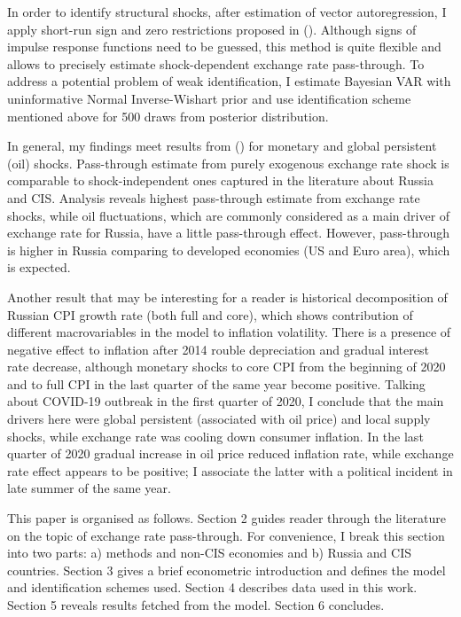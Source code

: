 \documentclass[12pt, a4paper]{extarticle}
\begin{document}
In order to identify structural shocks, after estimation of vector autoregression, I apply short-run sign and zero restrictions proposed in (\cite{Arias2014}). Although signs of impulse response functions need to be guessed, this method is quite flexible and allows to precisely estimate shock-dependent exchange rate pass-through. To address a potential problem of weak identification, I estimate Bayesian VAR with uninformative Normal Inverse-Wishart prior and use identification scheme mentioned above for 500 draws from posterior distribution. 

In general, my findings meet results from (\cite{Khotulev2020}) for monetary and global persistent (oil) shocks. Pass-through estimate from purely exogenous exchange rate shock is comparable to shock-independent ones captured in the literature about Russia and CIS. Analysis reveals highest pass-through estimate from exchange rate shocks, while oil fluctuations, which are commonly considered as a main driver of exchange rate for Russia, have a little pass-through effect. However, pass-through is higher in Russia comparing to developed economies (US and Euro area), which is expected.

Another result that may be interesting for a reader is historical decomposition of Russian CPI growth rate (both full and core), which shows contribution of different macrovariables in the model to inflation volatility. There is a presence of negative effect to inflation after 2014 rouble depreciation and gradual interest rate decrease, although monetary shocks to core CPI from the beginning of 2020 and to full CPI in the last quarter of the same year become positive. Talking about COVID-19 outbreak in the first quarter of 2020, I conclude that the main drivers here were global persistent (associated with oil price) and local supply shocks, while exchange rate was cooling down consumer inflation. In the last quarter of 2020 gradual increase in oil price reduced inflation rate, while exchange rate effect appears to be positive; I associate the latter with a political incident in late summer of the same year.

This paper is organised as follows. Section 2 guides reader through the literature on the topic of exchange rate pass-through. For convenience, I break this section into two parts: a) methods and non-CIS economies and b) Russia and CIS countries. Section 3 gives a brief econometric introduction and defines the model and identification schemes used. Section 4 describes data used in this work. Section 5 reveals results fetched from the model. Section 6 concludes.
\end{document}
